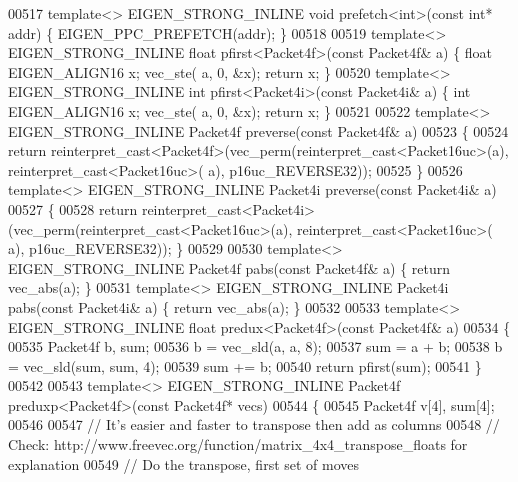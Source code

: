 \begin{DoxyCode}
{00517 \textcolor{keyword}{template}<> EIGEN\_STRONG\_INLINE \textcolor{keywordtype}{void} prefetch<int>(\textcolor{keyword}{const} \textcolor{keywordtype}{int}*     addr)    \{ EIGEN\_PPC\_PREFETCH(addr); \}
00518 
00519 \textcolor{keyword}{template}<> EIGEN\_STRONG\_INLINE \textcolor{keywordtype}{float}  pfirst<Packet4f>(\textcolor{keyword}{const} Packet4f& a) \{ \textcolor{keywordtype}{float} EIGEN\_ALIGN16 x; vec\_ste(
      a, 0, &x); \textcolor{keywordflow}{return} x; \}
00520 \textcolor{keyword}{template}<> EIGEN\_STRONG\_INLINE \textcolor{keywordtype}{int}    pfirst<Packet4i>(\textcolor{keyword}{const} Packet4i& a) \{ \textcolor{keywordtype}{int}   EIGEN\_ALIGN16 x; vec\_ste(
      a, 0, &x); \textcolor{keywordflow}{return} x; \}
00521 
00522 \textcolor{keyword}{template}<> EIGEN\_STRONG\_INLINE Packet4f preverse(\textcolor{keyword}{const} Packet4f& a)
00523 \{
00524   \textcolor{keywordflow}{return} \textcolor{keyword}{reinterpret\_cast<}Packet4f\textcolor{keyword}{>}(vec\_perm(reinterpret\_cast<Packet16uc>(a), reinterpret\_cast<Packet16uc>(
      a), p16uc\_REVERSE32));
00525 \}
00526 \textcolor{keyword}{template}<> EIGEN\_STRONG\_INLINE Packet4i preverse(\textcolor{keyword}{const} Packet4i& a)
00527 \{
00528   \textcolor{keywordflow}{return} \textcolor{keyword}{reinterpret\_cast<}Packet4i\textcolor{keyword}{>}(vec\_perm(reinterpret\_cast<Packet16uc>(a), reinterpret\_cast<Packet16uc>(
      a), p16uc\_REVERSE32)); \}
00529 
00530 \textcolor{keyword}{template}<> EIGEN\_STRONG\_INLINE Packet4f pabs(\textcolor{keyword}{const} Packet4f& a) \{ \textcolor{keywordflow}{return} vec\_abs(a); \}
00531 \textcolor{keyword}{template}<> EIGEN\_STRONG\_INLINE Packet4i pabs(\textcolor{keyword}{const} Packet4i& a) \{ \textcolor{keywordflow}{return} vec\_abs(a); \}
00532 
00533 \textcolor{keyword}{template}<> EIGEN\_STRONG\_INLINE \textcolor{keywordtype}{float} predux<Packet4f>(\textcolor{keyword}{const} Packet4f& a)
00534 \{
00535   Packet4f b, sum;
00536   b   = vec\_sld(a, a, 8);
00537   sum = a + b;
00538   b   = vec\_sld(sum, sum, 4);
00539   sum += b;
00540   \textcolor{keywordflow}{return} pfirst(sum);
00541 \}
00542 
00543 \textcolor{keyword}{template}<> EIGEN\_STRONG\_INLINE Packet4f preduxp<Packet4f>(\textcolor{keyword}{const} Packet4f* vecs)
00544 \{
00545   Packet4f v[4], sum[4];
00546 
00547   \textcolor{comment}{// It's easier and faster to transpose then add as columns}
00548   \textcolor{comment}{// Check: http://www.freevec.org/function/matrix\_4x4\_transpose\_floats for explanation}
00549   \textcolor{comment}{// Do the transpose, first set of moves}
}
\end{DoxyCode}
